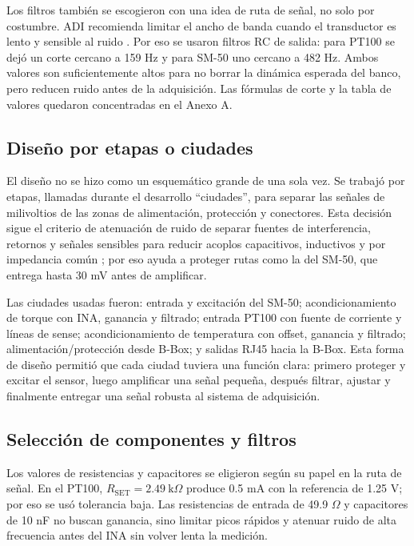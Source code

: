 \documentclass[conference]{IEEEtran}
\begin{document}
Los filtros también se escogieron con una idea de ruta de señal, no solo por costumbre. ADI recomienda limitar el ancho de banda cuando el transductor es lento y sensible al ruido \cite{adi_paths}. Por eso se usaron filtros RC de salida: para PT100 se dejó un corte cercano a 159 Hz y para SM-50 uno cercano a 482 Hz. Ambos valores son suficientemente altos para no borrar la dinámica esperada del banco, pero reducen ruido antes de la adquisición. Las fórmulas de corte y la tabla de valores quedaron concentradas en el Anexo A.

\subsection{Diseño por etapas o ciudades}

El diseño no se hizo como un esquemático grande de una sola vez. Se trabajó por etapas, llamadas durante el desarrollo ``ciudades'', para separar las señales de milivoltios de las zonas de alimentación, protección y conectores. Esta decisión sigue el criterio de atenuación de ruido de separar fuentes de interferencia, retornos y señales sensibles para reducir acoplos capacitivos, inductivos y por impedancia común \cite{cardenas_ruido}; por eso ayuda a proteger rutas como la del SM-50, que entrega hasta 30 mV antes de amplificar.

Las ciudades usadas fueron: entrada y excitación del SM-50; acondicionamiento de torque con INA, ganancia y filtrado; entrada PT100 con fuente de corriente y líneas de sense; acondicionamiento de temperatura con offset, ganancia y filtrado; alimentación/protección desde B-Box; y salidas RJ45 hacia la B-Box. Esta forma de diseño permitió que cada ciudad tuviera una función clara: primero proteger y excitar el sensor, luego amplificar una señal pequeña, después filtrar, ajustar y finalmente entregar una señal robusta al sistema de adquisición.

\subsection{Selección de componentes y filtros}

Los valores de resistencias y capacitores se eligieron según su papel en la ruta de señal. En el PT100, $R_{\text{SET}}=2.49~\text{k}\Omega$ produce 0.5 mA con la referencia de 1.25 V; por eso se usó tolerancia baja. Las resistencias de entrada de 49.9 $\Omega$ y capacitores de 10 nF no buscan ganancia, sino limitar picos rápidos y atenuar ruido de alta frecuencia antes del INA sin volver lenta la medición.
\end{document}

